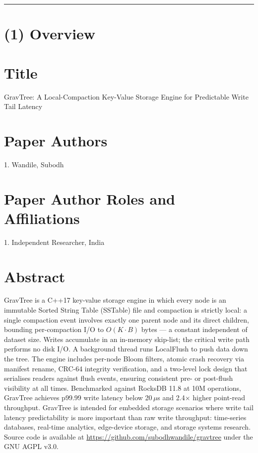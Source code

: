 \documentclass{jors}
\begin{document}
\rule{\textwidth}{1pt}

\section*{(1) Overview}

\section*{Title}

GravTree: A Local-Compaction Key-Value Storage Engine for Predictable Write Tail Latency

\section*{Paper Authors}

1. Wandile, Subodh

\section*{Paper Author Roles and Affiliations}

1. Independent Researcher, India

\section*{Abstract}

GravTree is a C++17 key-value storage engine in which every node is an
immutable Sorted String Table (SSTable) file and compaction is strictly
local: a single compaction event involves exactly one parent node and its
direct children, bounding per-compaction I/O to $O(K \cdot B)$ bytes — a
constant independent of dataset size. Writes accumulate in an in-memory
skip-list; the critical write path performs no disk I/O. A background
thread runs LocalFlush to push data down the tree. The engine includes
per-node Bloom filters, atomic crash recovery via manifest rename, CRC-64
integrity verification, and a two-level lock design that serialises
readers against flush events, ensuring consistent pre- or post-flush
visibility at all times. Benchmarked against RocksDB 11.8 at 10M operations,
GravTree achieves p99.99 write latency below 20\,$\mu$s and 2.4$\times$
higher point-read throughput. GravTree is intended for embedded storage
scenarios where write tail latency predictability is more important than
raw write throughput: time-series databases, real-time analytics,
edge-device storage, and storage systems research. Source code is
available at \url{https://github.com/subodhwandile/gravtree} under the
GNU AGPL v3.0.
\end{document}
